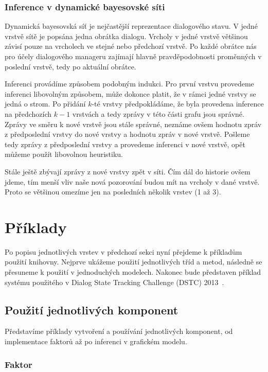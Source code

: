 \subsubsection{Inference v dynamické bayesovské síti}

Dynamická bayesovská síť je nejčastější reprezentace dialogového stavu.
V jedné vrstvě sítě je popsána jedna obrátka dialogu.
Vrcholy v jedné vrstvě většinou závisí pouze na vrcholech ve stejné nebo předchozí vrstvě.
Po každé obrátce nás pro účely dialogového manageru zajímají hlavně pravděpodobnosti proměnných v poslední vrstvě, tedy po aktuální obrátce.

Inferenci provádíme způsobem podobným indukci.
Pro první vrstvu provedeme inferenci libovolným způsobem, může dokonce platit, že v rámci jedné vrstvy se jedná o strom.
Po přidání $k$-té vrstvy předpokládáme, že byla provedena inference na předchozích $k-1$ vrstvách a tedy zprávy v této části grafu jsou správné.
Zprávy ve směru k nové vrstvě jsou stále správné, neznáme ovšem hodnotu zpráv z předposlední vrstvy do nové vrstvy a hodnotu zpráv v nové vrstvě.
Pošleme tedy zprávy z předposlední vrstvy a provedeme inferenci v nové vrstvě, opět můžeme použít libovolnou heuristiku.

Stále ještě zbývají zprávy z nové vrstvy zpět v síti.
Čím dál do historie ovšem jdeme, tím menší vliv naše nová pozorování budou mít na vrcholy v dané vrstvě.
Proto se většinou omezíme jen na posledních několik vrstev (1 až 3).

\section{Příklady}

Po popisu jednotlivých vrstev v předchozí sekci nyní přejdeme k příkladům použití knihovny.
Nejprve ukážeme použití jednotlivých tříd a metod, následně se přesuneme k použití v jednoduchých modelech.
Nakonec bude představen příklad systému použitého v Dialog State Tracking Challenge (DSTC) 2013~\cite{dstc2013}.

\subsection{Použití jednotlivých komponent}

Představíme příklady vytvoření a používání jednotlivých komponent, od implementace faktorů až po inferenci v grafickém modelu.

\subsubsection{Faktor}

